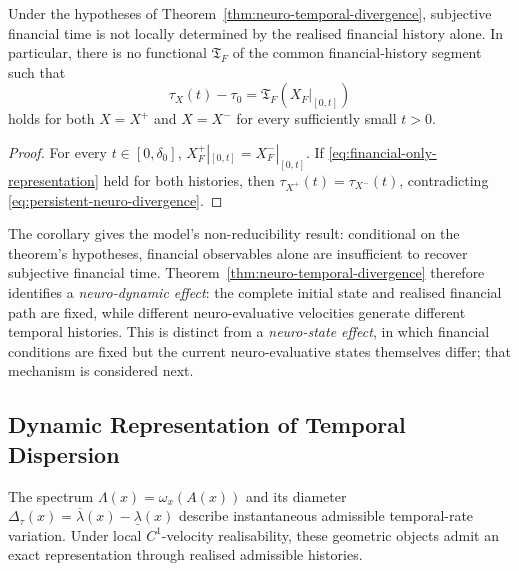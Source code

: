\documentclass[graybox,natbib]{SNmult}
\providecommand{\1}{}
\renewcommand{\1}{\mathbbm 1}
\begin{document}
\begin{corollary}
\label{cor:neuro-nonreducibility}

Under the hypotheses of
Theorem~\ref{thm:neuro-temporal-divergence}, subjective financial time is not
locally determined by the realised financial history alone. In particular,
there is no functional \(\mathfrak T_F\) of the common financial-history
segment such that
\begin{equation}
\tau_X(t)-\tau_0
=
\mathfrak T_F\!\left(X_F|_{[0,t]}\right)
\label{eq:financial-only-representation}
\end{equation}
holds for both \(X=X^+\) and \(X=X^-\) for every sufficiently small \(t>0\).
\end{corollary}

\begin{proof}

For every \(t\in[0,\delta_0]\),
\(X_F^+|_{[0,t]}=X_F^-|_{[0,t]}\). If
\eqref{eq:financial-only-representation} held for both histories, then
\(\tau_{X^+}(t)=\tau_{X^-}(t)\), contradicting
\eqref{eq:persistent-neuro-divergence}.
\end{proof}

The corollary gives the model's non-reducibility result: conditional on the
theorem's hypotheses, financial observables alone are insufficient to recover
subjective financial time. Theorem~\ref{thm:neuro-temporal-divergence}
therefore identifies a \emph{neuro-dynamic effect}: the complete initial state
and realised financial path are fixed, while different neuro-evaluative
velocities generate different temporal histories. This is distinct from a
\emph{neuro-state effect}, in which financial conditions are fixed but the
current neuro-evaluative states themselves differ; that mechanism is considered
next.










\subsection{Dynamic Representation of Temporal Dispersion}
\label{subsec:dispersion-representation}

The spectrum
\(\Lambda(x)=\omega_x(A(x))\) and its diameter
\(\Delta_\tau(x)=\overline\lambda(x)-\underline\lambda(x)\)
describe instantaneous admissible temporal-rate variation. Under local
\(C^1\)-velocity realisability, these geometric objects admit an exact
representation through realised admissible histories.
\end{document}
